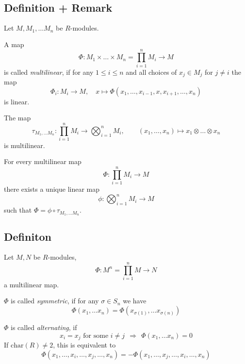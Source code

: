 \documentclass[12pt]{book}
\begin{document}
\begin{spacing}{1.3}
\subsection{Definition + Remark} %
Let $M, M_1, \ldots M_n$ be $R$-modules. 
\begin{compactenum}
\item A map 
$$\Phi: M_1 \times \ldots \times M_n = \prod_{i=1}^n M_i \longrightarrow M$$
is called \textit{multilinear}, if for any $1 \leqslant i \leqslant n$ and all choices of $x_j \in M_j$ for $j \neq i$ the map 
$$\Phi_i: M_i \longrightarrow M, \quad x \mapsto \Phi(x_1, \ldots, x_{i-1},x,x_{i+1},\ldots, x_n)$$
is linear.
\item The map
$$\tau_{M_1, \ldots M_n}: \prod_{i=1}^n M_i \longrightarrow \bigotimes_{i=1}^n M_i, \qquad (x_1, \ldots, x_n) \mapsto x_1 \otimes \ldots \otimes x_n$$
is multilinear.
\item For every multilinear map $$\Phi: \prod_{i=1}^n M_i \longrightarrow M$$
there exists a unique linear map
$$\phi: \bigotimes_{i=1}^n M_i \longrightarrow M$$
such that $\Phi= \phi \circ \tau_{M_1, \ldots M_n}$.
\end{compactenum}

\subsection{Definiton} %
Let $M,N$ be $R$-modules, $$\Phi:M^n= \prod_{i=1}^n M \longrightarrow N$$
a multilinear map.
\begin{compactenum}
\item $\Phi$ is called \textit{symmetric}, if for any $\sigma \in S_n$ we have
$$\Phi(x_1,\ldots x_n) = \Phi(x_{\sigma(1)}, \ldots x_{\sigma(n)})$$
\item $\Phi$ is called \textit{alternating}, if
$$x_i = x_j \textrm{ for some } i\neq j \ \ \Longrightarrow \ \ \Phi(x_1, \ldots x_n)=0$$
If $\textrm{char}(R) \neq 2$, this is equivalent to 
$$\Phi(x_1, \ldots, x_i, \ldots, x_j, \ldots, x_n)=- \Phi(x_1, \ldots, x_j, \ldots, x_i, \ldots, x_n)$$
\end{compactenum}


\end{spacing}
\end{document}
